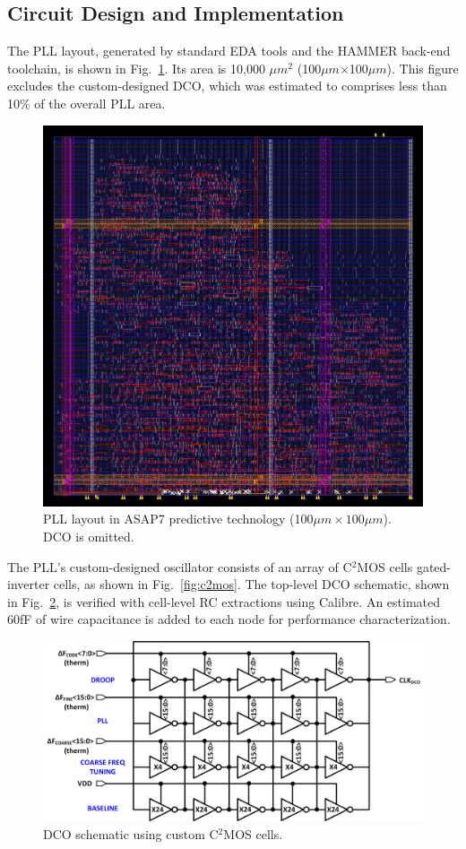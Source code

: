 \documentclass[twoside,9pt,journal,letterpage]{IEEEtran}
\begin{document}
\vspace{-7pt}
\subsection{Circuit Design and Implementation}
\label{sec:circuit_design}

The PLL layout, generated by standard EDA tools and the HAMMER \cite{wanghammer} back-end toolchain, is shown in Fig.\ \ref{fig:layout}. Its area is 10,000 $\mu m^2$ (100$\mu m$$\times$100$\mu m$). This figure excludes the custom-designed DCO, which was estimated to comprises less than 10\% of the overall PLL area.


\begin{figure}[h]
	\centering
	\includegraphics[width=0.5\columnwidth]{pnr3.png}
	\caption{PLL layout in ASAP7 predictive technology (100$\mu m\times100\mu m$). DCO is omitted.}
	\label{fig:layout}
\end{figure}

The PLL's custom-designed oscillator consists of an array of C$^2$MOS cells gated-inverter cells, as shown in Fig.\ \ref{fig:c2mos}. The top-level DCO schematic, shown in Fig.\ \ref{fig:dco}, is verified with cell-level RC extractions using Calibre. An estimated 60fF of wire capacitance is added to each node for performance characterization. 

\begin{figure}[h]
	\centering
	\includegraphics[width=0.9\columnwidth]{fig_dco}
	\caption{DCO schematic using custom C$^2$MOS cells.}
	\label{fig:dco}
\end{figure}
\end{document}
